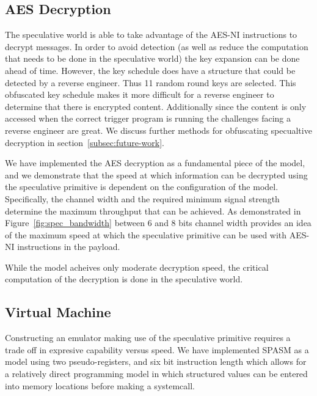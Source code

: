 
\subsection{AES Decryption}
\label{subsec:impl-aes}
The speculative world is able to take advantage of the AES-NI instructions to
decrypt messages. In order to avoid detection (as well as reduce the computation
that needs to be done in the speculative world) the key expansion can be done
ahead of time. However, the key schedule does have a structure that could be
detected by a reverse engineer. Thus 11 random round keys are selected. This
obfuscated key schedule makes it more difficult for a reverse engineer to
determine that there is encrypted content. Additionally since the content is
only accessed when the correct trigger program is running the challenges facing
a reverse engineer are great. We discuss further methods for obfuscating
specualtive decryption in section~\ref{subsec:future-work}. 


We have implemented the AES decryption as a fundamental piece of the \speculake model,
and we demonstrate that the speed at which information can be decrypted using the speculative 
primitive is dependent on the configuration of the \speculake model. Specifically,
the channel width and the required minimum signal strength determine the maximum
throughput that can be achieved. As demonstrated in Figure~\ref{fig:spec_bandwidth} 
between 6 and 8 bits channel width provides an idea of the maximum speed at which the 
speculative primitive can be used with AES-NI instructions in the payload. 

While the \speculake model acheives only moderate decryption speed, the 
critical computation of the decryption is done in the speculative world. 

\FigSpecBandwidth

\subsection{Virtual Machine}
\label{subsec:spasm}

Constructing an emulator making use of the speculative primitive requires  
a trade off in expresive capability versus speed. 
We have implemented SPASM as a model using two pseudo-registers, and six 
bit instruction length which allows for a relatively direct programming model 
in which structured values can be entered into memory locations before making 
a systemcall.

